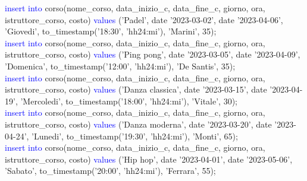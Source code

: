 \documentclass{article}
\begin{document}
\begin{flushleft}
{        \vspace{2mm}
        \hspace*{0.5em}\textcolor{blue}{insert into} corso(nome\_corso, data\_inizio\_c, data\_fine\_c, giorno, ora, \hspace*{0.0em} istruttore\_corso, costo) \textcolor{blue}{values} ('Padel', date '2023-03-02', date '2023-04-06', \hspace*{0.4em}'Giovedi', to\_timestamp('18:30', 'hh24:mi'), 'Marini', 35); \\
        \vspace{2mm}
        \hspace*{0.5em}\textcolor{blue}{insert into} corso(nome\_corso, data\_inizio\_c, data\_fine\_c, giorno, ora, \hspace*{0.0em} istruttore\_corso, costo) \textcolor{blue}{values} ('Ping pong', date '2023-03-05', date \hspace*{0.4em}'2023-04-09', 'Domenica', to\_timestamp('12:00', 'hh24:mi'), 'De Santis', 35); \\
        \vspace{2mm}
        \hspace*{0.5em}\textcolor{blue}{insert into} corso(nome\_corso, data\_inizio\_c, data\_fine\_c, giorno, ora, \hspace*{0.0em} istruttore\_corso, costo) \textcolor{blue}{values} ('Danza classica', date '2023-03-15', date \hspace*{0.4em}'2023-04-19', 'Mercoledi', to\_timestamp('18:00', 'hh24:mi'), 'Vitale', 30); \\
        \vspace{2mm}
        \hspace*{0.5em}\textcolor{blue}{insert into} corso(nome\_corso, data\_inizio\_c, data\_fine\_c, giorno, ora, \hspace*{0.0em} istruttore\_corso, costo) \textcolor{blue}{values} ('Danza moderna', date '2023-03-20', date \hspace*{0.4em}'2023-04-24', 'Lunedi', to\_timestamp('19:30', 'hh24:mi'), 'Monti', 65); \\
        \vspace{2mm}
        \hspace*{0.5em}\textcolor{blue}{insert into} corso(nome\_corso, data\_inizio\_c, data\_fine\_c, giorno, ora, \hspace*{0.0em} istruttore\_corso, costo) \textcolor{blue}{values} ('Hip hop', date '2023-04-01', date \hspace*{0.4em}'2023-05-06', 'Sabato', to\_timestamp('20:00', 'hh24:mi'), 'Ferrara', 55); \\
}
\end{flushleft}
\end{document}
